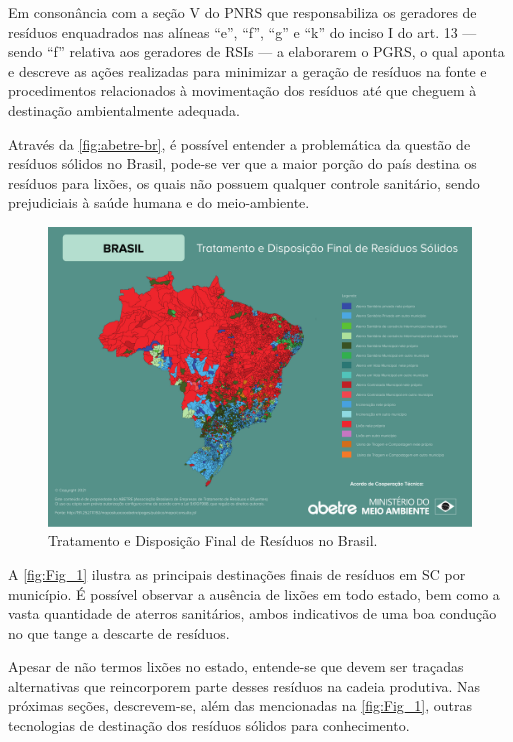 Em consonância com a seção V do \gls{PNRS} que responsabiliza os geradores de resíduos enquadrados nas alíneas  “e”, “f”, “g” e “k” do inciso I do art. 13 — sendo “f” relativa aos geradores de \gls{RSI}s — a elaborarem o \gls{PGRS}, o qual aponta e descreve as ações realizadas para minimizar a geração de resíduos na fonte e procedimentos relacionados à movimentação dos resíduos até que cheguem à destinação ambientalmente adequada.

Através da \autoref{fig:abetre-br}, é possível entender a problemática da questão de resíduos sólidos no Brasil, pode-se ver que a maior porção do país destina os resíduos para lixões, os quais não possuem qualquer controle sanitário, sendo prejudiciais à saúde humana e do meio-ambiente.

\begin{figure}[htb]
	\caption{\label{fig:abetre-br} Tratamento e Disposição Final de Resíduos no Brasil.}
	\begin{center}
		\includegraphics[scale=0.50]{images/abetre_brasil.pdf}
	\end{center}
\end{figure}

A \autoref{fig:Fig_1} ilustra as principais destinações finais de resíduos em \gls{SC} por município. É possível observar a ausência de lixões em todo estado, bem como a vasta quantidade de aterros sanitários, ambos indicativos de uma boa condução no que tange a descarte de resíduos.

Apesar de não termos lixões no estado, entende-se que devem ser traçadas alternativas que reincorporem parte desses resíduos na cadeia produtiva. Nas próximas seções, descrevem-se, além das mencionadas na \autoref{fig:Fig_1}, outras tecnologias de destinação dos resíduos sólidos para conhecimento.

